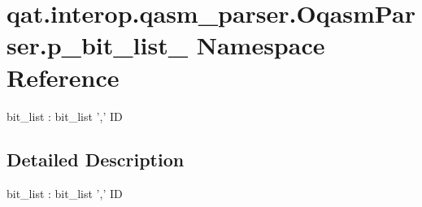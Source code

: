 \hypertarget{namespaceqat_1_1interop_1_1qasm__parser_1_1OqasmParser_1_1p__bit__list__1}{\section{qat.\-interop.\-qasm\-\_\-parser.\-Oqasm\-Parser.\-p\-\_\-bit\-\_\-list\-\_ Namespace Reference}
\label{namespaceqat_1_1interop_1_1qasm__parser_1_1OqasmParser_1_1p__bit__list__1}
}


bit\-\_\-list \-: bit\-\_\-list ',' I\-D  




\subsection{Detailed Description}
bit\-\_\-list \-: bit\-\_\-list ',' I\-D 